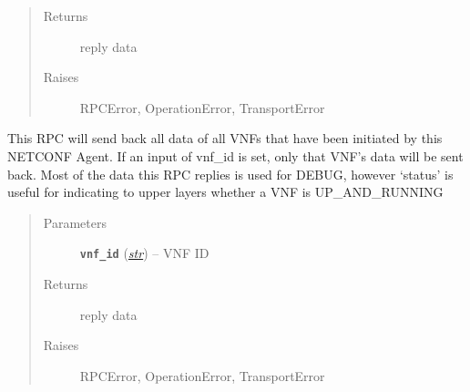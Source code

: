 \documentclass[letterpaper,10pt,english]{sphinxmanual}
\begin{document}
\begin{fulllineitems}
\begin{fulllineitems}
\begin{quote}
\begin{description}
\item[{Returns}] \leavevmode
reply data

\item[{Raises}] \leavevmode
RPCError, OperationError, TransportError

\end{description}\end{quote}

\end{fulllineitems}


\begin{fulllineitems}
\label{adapt/domain_adapters:escape.adapt.domain_adapters.VNFStarterAdapter.getVNFInfo}
This RPC will send back all data of all VNFs that have been initiated by
this NETCONF Agent. If an input of vnf\_id is set, only that VNF's data
will be sent back. Most of the data this RPC replies is used for DEBUG,
however `status' is useful for indicating to upper layers whether a VNF
is UP\_AND\_RUNNING
\begin{quote}\begin{description}
\item[{Parameters}] \leavevmode
\textbf{\texttt{vnf\_id}} (\href{https://docs.python.org/2.7/library/functions.html\#str}{\emph{str}}) -- VNF ID

\item[{Returns}] \leavevmode
reply data

\item[{Raises}] \leavevmode
RPCError, OperationError, TransportError

\end{description}\end{quote}

\end{fulllineitems}


\end{fulllineitems}

\end{document}
